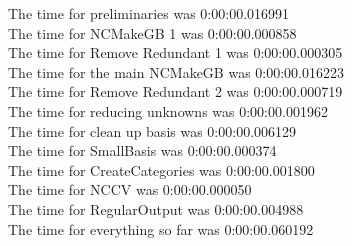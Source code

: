 \documentclass[rep10,leqno]{report}
\begin{document}
\noindent
The time for preliminaries was 0:00:00.016991\\
The time for NCMakeGB 1 was 0:00:00.000858\\
The time for Remove Redundant 1 was 0:00:00.000305\\
The time for the main NCMakeGB was 0:00:00.016223\\
The time for Remove Redundant 2 was 0:00:00.000719\\
The time for reducing unknowns was 0:00:00.001962\\
The time for clean up basis was 0:00:00.006129\\
The time for SmallBasis was 0:00:00.000374\\
The time for CreateCategories was 0:00:00.001800\\
The time for NCCV was 0:00:00.000050\\
The time for RegularOutput was 0:00:00.004988\\
The time for everything so far was 0:00:00.060192\\
\end{document}

